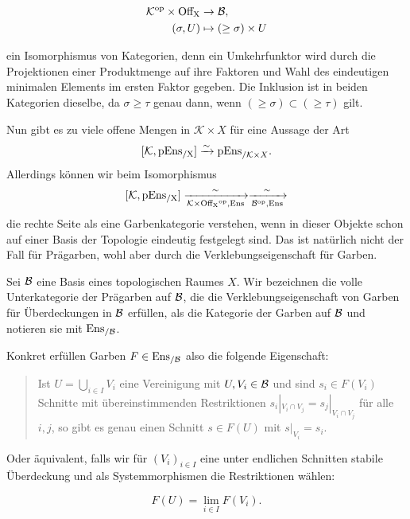 \begin{align*}
  \mathcal{K}^\mathrm{op} \times \operatorname{Off_X} &\to \mathcal{B}, \\
  (\sigma, U) &\mapsto (\geq \sigma) \times U
\end{align*}

ein Isomorphismus von Kategorien, denn ein Umkehrfunktor wird durch
die Projektionen einer Produktmenge auf ihre Faktoren und Wahl des
eindeutigen minimalen Elements im ersten Faktor gegeben. Die Inklusion
ist in beiden Kategorien dieselbe, da $\sigma \geq \tau$ genau dann,
wenn $(\geq \sigma) \subset (\geq \tau)$ gilt.

Nun gibt es zu viele offene Mengen in $\mathcal{K} \times X$ für eine
Aussage der Art
\[
  [\mathcal{K}, \operatorname{pEns_{/X}}] \xrightarrow[]{\sim} \mathrm{pEns}_{/\mathcal{K} \times X}.
\]
Allerdings können wir beim Isomorphismus
\[
  [\mathcal{K}, \operatorname{pEns_{/X}}] \xrightarrow[\mathcal{K} \times \operatorname{Off_X}^\mathrm{op}, \operatorname{Ens}]{\sim} \xrightarrow[\mathcal{B}^\mathrm{op}, \operatorname{Ens}]{\sim}
\]
die rechte Seite als eine Garbenkategorie verstehen, wenn in dieser
Objekte schon auf einer Basis der Topologie eindeutig festgelegt
sind. Das ist natürlich nicht der Fall für Prägarben, wohl aber durch
die Verklebungseigenschaft für Garben.

\begin{defn}
  Sei $\mathcal{B}$ eine Basis eines topologischen Raumes $X$.  Wir
  bezeichnen die volle Unterkategorie der Prägarben auf $\mathcal{B}$,
  die die Verklebungseigenschaft von Garben für Überdeckungen in
  $\mathcal{B}$ erfüllen, als die Kategorie der Garben auf
  $\mathcal{B}$ und notieren sie mit $\operatorname{Ens_{/\mathcal{B}}}$.
\end{defn}

Konkret erfüllen Garben $F \in \operatorname{Ens_{/\mathcal{B}}}$ also die folgende
Eigenschaft:

\begin{quote}
  Ist $U = \bigcup_{i \in I} V_i$ eine Vereinigung mit $U, V_i \in
  \mathcal{B}$ und sind $s_i \in F(V_i)$ Schnitte mit
  übereinstimmenden Restriktionen $s_i |_{V_i \cap V_j} = s_j |_{V_i
    \cap V_j}$ für alle $i, j$, so gibt es genau einen Schnitt $s \in
  F(U)$ mit $s |_{V_i} = s_i$.
\end{quote}

Oder äquivalent, falls wir für $(V_i)_{i \in I}$ eine unter endlichen
Schnitten stabile Überdeckung und als Systemmorphismen die
Restriktionen wählen:

\[ F(U) = \lim_{i \in I} F(V_i) . \]

